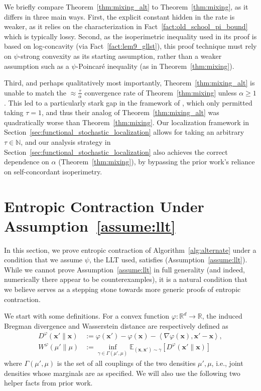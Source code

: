 \documentclass[11pt]{article}
\newcommand{\defeq}{:=}
\newcommand{\inprod}[2]{\left\langle#1, #2\right\rangle}
\newcommand{\R}{\mathbb{R}}
\newcommand{\N}{\mathbb{N}}
\newcommand{\E}{\mathbb{E}}
\newcommand{\Brack}[1]{\left[#1\right]}
\newcommand{\0}{\mathbf{0}}
\newcommand{\1}{\mathbf{1}}
\newcommand{\vx}{\mathbf{x}}
\newcommand{\vhi}{\varphi}
\begin{document}
We briefly compare Theorem~\ref{thm:mixing_alt} to Theorem~\ref{thm:mixing}, as it differs in three main ways. First, the explicit constant hidden in the rate is weaker, as it relies on the characterization in Fact~\ref{fact:old_school_pi_bound} which is typically lossy. Second, as the isoperimetric inequality used in its proof is based on log-concavity (via Fact~\ref{fact:lem9_gllst}), this proof technique must rely on $\psi$-strong convexity as its starting assumption, rather than a weaker assumption such as a $\psi$-Poincar\'e inequality (as in Theorem~\ref{thm:mixing}).

Third, and perhaps qualitatively most importantly, Theorem~\ref{thm:mixing_alt} is unable to match the $\approx \frac \tau \alpha$ convergence rate of Theorem~\ref{thm:mixing} unless $\alpha \ge 1$. This led to a particularly stark gap in the framework of \cite{GopiLLST25}, which only permitted taking $\tau = 1$, and thus their analog of Theorem~\ref{thm:mixing_alt} was quadratically worse than Theorem~\ref{thm:mixing}. Our localization framework in Section~\ref{sec:functional_stochastic_localization} allows for taking an arbitrary $\tau \in \N$, and our analysis strategy in Section~\ref{sec:functional_stochastic_localization} also achieves the correct dependence on $\alpha$ (Theorem~\ref{thm:mixing}), by bypassing the prior work's reliance on self-concordant isoperimetry.
\section{Entropic Contraction Under Assumption~\ref{assume:llt}}\label{app:entropy}
In this section, we prove entropic contraction of Algorithm~\ref{alg:alternate}
under a condition that we assume $\psi$, the LLT used, satisfies (Assumption~\ref{assume:llt}). While we cannot prove Assumption~\ref{assume:llt} in full generality (and indeed, numerically there appear to be counterexamples), it is a natural condition that we believe serves as a stepping stone towards more generic proofs of entropic contraction.

We start with some definitions. For a convex function $\vhi:\R^d\to\R$, the induced Bregman divergence and Wasserstein distance are respectively defined as
\begin{align*}
    D^\vhi(\vx'\|\vx) &\defeq \vhi(\vx') - \vhi(\vx) -\inprod{\nabla\vhi(\vx)}{\vx'-\vx},\\
    W^\vhi(\mu'\|\mu) &\defeq \inf_{\gamma \in \Gamma(\mu',\mu)}\E_{(\vx,\vx')\sim \gamma}\Brack{D^\vhi(\vx'\|\vx)}
\end{align*}
where $\Gamma(\mu',\mu)$ is the set of all couplings of the two densities $\mu',\mu$, i.e., joint densities whose marginals are as specified. We will also use the following two helper facts from prior work.
\end{document}
